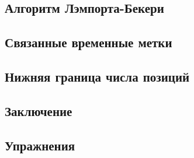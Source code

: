 \subsection{Алгоритм Лэмпорта-Бекери}

\subsection{Связанные временные метки}

\subsection{Нижняя граница числа позиций}

\subsection{Заключение}

\subsection{Упражнения}